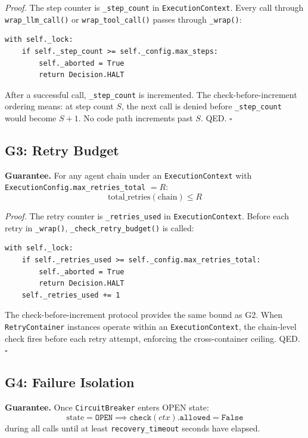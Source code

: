\documentclass[11pt]{article}
\newenvironment{proof}{\par\noindent\textit{Proof.}\enspace}{\hfill$\square$\par\medskip}
\begin{document}
\begin{proof}
The step counter is \texttt{\_step\_count} in \texttt{ExecutionContext}. Every
call through \texttt{wrap\_llm\_call()} or \texttt{wrap\_tool\_call()} passes
through \texttt{\_wrap()}:

\begin{lstlisting}
with self._lock:
    if self._step_count >= self._config.max_steps:
        self._aborted = True
        return Decision.HALT
\end{lstlisting}

After a successful call, \texttt{\_step\_count} is incremented. The
check-before-increment ordering means: at step count $S$, the next call is
denied before \texttt{\_step\_count} would become $S{+}1$. No code path
increments past $S$. QED.
\end{proof}

\subsection{G3: Retry Budget}

\textbf{Guarantee.} For any agent chain under an \texttt{ExecutionContext}
with \texttt{ExecutionConfig.max\_retries\_total} $= R$:
\[
  \text{total\_retries}(\text{chain}) \leq R
\]

\begin{proof}
The retry counter is \texttt{\_retries\_used} in \texttt{ExecutionContext}.
Before each retry in \texttt{\_wrap()}, \texttt{\_check\_retry\_budget()} is
called:

\begin{lstlisting}
with self._lock:
    if self._retries_used >= self._config.max_retries_total:
        self._aborted = True
        return Decision.HALT
    self._retries_used += 1
\end{lstlisting}

The check-before-increment protocol provides the same bound as G2. When
\texttt{RetryContainer} instances operate within an \texttt{ExecutionContext},
the chain-level check fires before each retry attempt, enforcing the
cross-container ceiling. QED.
\end{proof}

\subsection{G4: Failure Isolation}

\textbf{Guarantee.} Once \texttt{CircuitBreaker} enters OPEN state:
\[
  \text{state} = \texttt{OPEN} \implies \texttt{check}(\textit{ctx}).\texttt{allowed} = \texttt{False}
\]
during all calls until at least \texttt{recovery\_timeout} seconds have
elapsed.
\end{document}
